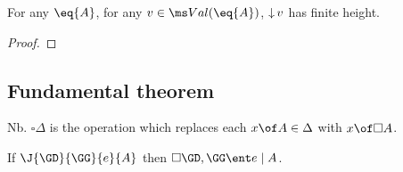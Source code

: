 \documentclass{article}
\newcommand{\disc}[1]{\square{#1}}
\newcommand{\lr}[2]{#2\mathrel{|}#1}
\newcommand{\lrcx}[3]{#1 \ent \lr{#2}{#3}}
\begin{document}
\begin{theorem}
  For any $\eq{A}$, for any $v \in \Val{\eq{A}}$, ${\mathop{\downarrow}{v}}$ has finite height.
\end{theorem}

\begin{proof}
  \TODO
\end{proof}


\subsection{Fundamental theorem}

\newcommand{\cxdisc}[1]{\disc{#1}}

Nb. $\cxdisc{\Delta}$ is the operation which replaces each $x \of A \in \Delta$
with $x \of \disc{A}$.

\begin{theorem}
  If $\J{\GD}{\GG}{e}{A}$ then $\lrcx{\cxdisc{\GD},\GG}{A}{e}$.
\end{theorem}
\end{document}
